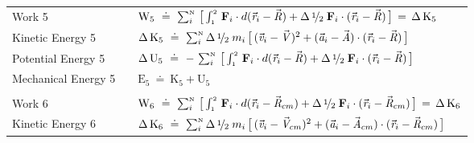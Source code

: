 \documentclass[10pt]{article}
\newcommand{\med}{\raise.5ex\hbox{$\scriptstyle 1$}\kern-.15em/\kern-.09em\lower.25ex\hbox{$\scriptstyle 2$}}
\begin{document}
\begin{tabular}{lll}
\\
Work 5 & \hspace{+0.33em} & ${\mathrm{W}}_5 ~\doteq~ \sum_i^{\scriptscriptstyle{\mathrm{N}}} \, \big [ \int_{\scriptscriptstyle 1}^{\scriptscriptstyle 2} \, {\mathbf{F}}_i \cdot d({\vec{\mathit{r}}_{i}} - {\vec{\mathit{R}}}) + \Delta \, \med \; {\mathbf{F}}_i \cdot ({\vec{\mathit{r}}_{i}} - {\vec{\mathit{R}}}) \, \big ] \,=\, \Delta \, {\mathrm{K}}_5$ \vspace{+0.99em} \\
Kinetic Energy 5 & \hspace{+0.33em} & $\Delta \, {\mathrm{K}}_5 ~\doteq~ \sum_i^{\scriptscriptstyle{\mathrm{N}}} \Delta \, \med \; m_i \, \big [ \, ({\vec{\mathit{v}}_{i}} - {\vec{\mathit{V}}})^2 + ({\vec{\mathit{a}}_{i}} - {\vec{\mathit{A}}}) \cdot ({\vec{\mathit{r}}_{i}} - {\vec{\mathit{R}}}) \, \big ]$ \vspace{+0.99em} \\
Potential Energy 5 & \hspace{+0.33em} & $\Delta \, {\mathrm{U}}_5 ~\doteq~ - \, \sum_i^{\scriptscriptstyle{\mathrm{N}}} \, \big [ \int_{\scriptscriptstyle 1}^{\scriptscriptstyle 2} \, {\mathbf{F}}_i \cdot d({\vec{\mathit{r}}_{i}} - {\vec{\mathit{R}}}) + \Delta \, \med \; {\mathbf{F}}_i \cdot ({\vec{\mathit{r}}_{i}} - {\vec{\mathit{R}}}) \, \big ]$ \vspace{+0.99em} \\
Mechanical Energy 5 & \hspace{+0.33em} & ${\mathrm{E}}_5 ~\doteq~ {\mathrm{K}}_5 + {\mathrm{U}}_5$ \vspace{+0.99em} \\
\\
Work 6 & \hspace{+0.33em} & ${\mathrm{W}}_6 ~\doteq~ \sum_i^{\scriptscriptstyle{\mathrm{N}}} \, \big [ \int_{\scriptscriptstyle 1}^{\scriptscriptstyle 2} \, {\mathbf{F}}_i \cdot d({\vec{\mathit{r}}_{i}} - {\vec{\mathit{R}}}_{cm}) + \Delta \, \med \; {\mathbf{F}}_i \cdot ({\vec{\mathit{r}}_{i}} - {\vec{\mathit{R}}}_{cm}) \, \big ] \,=\, \Delta \, {\mathrm{K}}_6$ \vspace{+0.99em} \\
Kinetic Energy 6 & \hspace{+0.33em} & $\Delta \, {\mathrm{K}}_6 ~\doteq~ \sum_i^{\scriptscriptstyle{\mathrm{N}}} \Delta \, \med \; m_i \, \big [ \, ({\vec{\mathit{v}}_{i}} - {\vec{\mathit{V}}}_{cm})^2 + ({\vec{\mathit{a}}_{i}} - {\vec{\mathit{A}}}_{cm}) \cdot ({\vec{\mathit{r}}_{i}} - {\vec{\mathit{R}}}_{cm}) \, \big ]$ \vspace{+0.99em} \\

\end{tabular}
\end{document}
